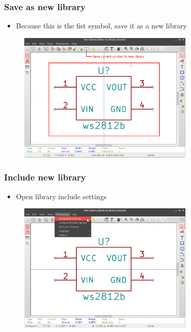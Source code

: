 \documentclass{beamer}
\begin{document}
\begin{frame}
  \frametitle{Save as new library}
  \begin{itemize}
    \item Because this is the fist symbol, save it as a new library
  \end{itemize}
  \begin{figure}[H]
    \centering
    \includegraphics[width=0.75\textwidth]{images/step_03.png}
  \end{figure}
\end{frame}


\begin{frame}
  \frametitle{Include new library}
  \begin{itemize}
    \item Open library include settings
  \end{itemize}
  \begin{figure}[H]
    \centering
    \includegraphics[width=0.75\textwidth]{images/step_04.png}
  \end{figure}
\end{frame}
\end{document}
